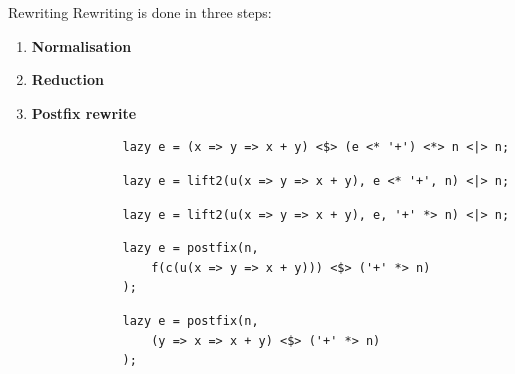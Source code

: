 \documentclass[aspectratio=169]{beamer}
\begin{document}
    \begin{frame}[fragile]{Rewriting}
            Rewriting is done in three steps:
        \begin{enumerate}
            \itemsep0.75em
            \item<2-> \textbf<2-3>{Normalisation}
            \item<4-> \textbf<4>{Reduction}
            \item<5-> \textbf<5-6>{Postfix rewrite}
        \end{enumerate}
        \bigskip

        \begin{overprint}
            \begin{verbatim}
                lazy e = (x => y => x + y) <$> (e <* '+') <*> n <|> n;
            \end{verbatim}
            \begin{verbatim}
                lazy e = lift2(u(x => y => x + y), e <* '+', n) <|> n;
            \end{verbatim}
            \begin{verbatim}
                lazy e = lift2(u(x => y => x + y), e, '+' *> n) <|> n;
            \end{verbatim}
            \begin{verbatim}
                lazy e = postfix(n,
                    f(c(u(x => y => x + y))) <$> ('+' *> n)
                );
            \end{verbatim}
            \begin{verbatim}
                lazy e = postfix(n,
                    (y => x => x + y) <$> ('+' *> n)
                );
            \end{verbatim}
        \end{overprint}
    \end{frame}
\end{document}
